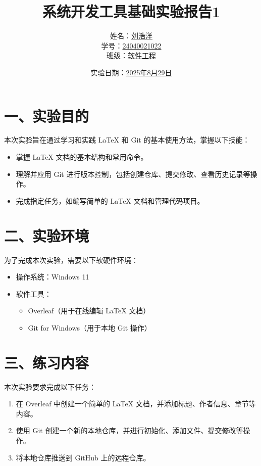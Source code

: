 \documentclass[a4paper, 12pt]{article}
\begin{document}
\title{\huge{系统开发工具基础实验报告1}}
\author{姓名：\underline{刘浩洋} \\ 
        学号：\underline{24040021022} \\ 
        班级：\underline{软件工程}}
\date{实验日期：\underline{2025年8月29日}}
\maketitle

\section*{一、实验目的}
本次实验旨在通过学习和实践 LaTeX 和 Git 的基本使用方法，掌握以下技能：
\begin{itemize}
    \item 掌握 LaTeX 文档的基本结构和常用命令。
    \item 理解并应用 Git 进行版本控制，包括创建仓库、提交修改、查看历史记录等操作。
    \item 完成指定任务，如编写简单的 LaTeX 文档和管理代码项目。
\end{itemize}

\section*{二、实验环境}
为了完成本次实验，需要以下软硬件环境：
\begin{itemize}
    \item 操作系统：Windows 11
    \item 软件工具：
    \begin{itemize}
        \item Overleaf（用于在线编辑 LaTeX 文档）
        \item Git for Windows（用于本地 Git 操作）
    \end{itemize}
\end{itemize}

\section*{三、练习内容}
本次实验要求完成以下任务：
\begin{enumerate}
    \item 在 Overleaf 中创建一个简单的 LaTeX 文档，并添加标题、作者信息、章节等内容。
    \item 使用 Git 创建一个新的本地仓库，并进行初始化、添加文件、提交修改等操作。
    \item 将本地仓库推送到 GitHub 上的远程仓库。
\end{enumerate}
\end{document}
